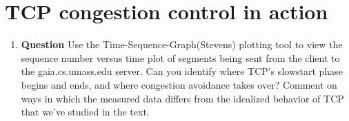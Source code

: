 \documentclass[12pt,letterpaper]{article}
\newcommand{\q}{\textbf{Question} }
\begin{document}
\section{TCP congestion control in action}
\begin{enumerate}[resume]
\item \q Use the Time-Sequence-Graph(Stevens) plotting tool to view the
sequence number versus time plot of segments being sent from the client to the
gaia.cs.umass.edu server.  Can you identify where TCP’s slowstart phase begins
and ends, and where congestion avoidance takes over?  Comment on ways in which
the measured data differs from the idealized behavior of TCP that we’ve studied
in the text. 

\end{enumerate}
\end{document}
